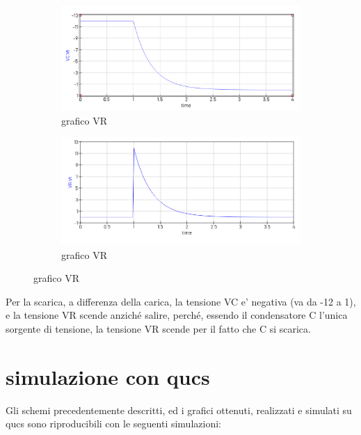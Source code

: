\documentclass[12pt]{article}
\begin{document}
\begin{figure}[h!]
  \centering
  \begin{subfigure}[b]{0.49\linewidth}
    \includegraphics[width=\linewidth]{data/scarica-VC.png}
    \caption*{grafico VR}
  \end{subfigure}
  \begin{subfigure}[b]{0.49\linewidth}
    \includegraphics[width=\linewidth]{data/scarica-VR.png}
    \caption*{grafico VR}
  \end{subfigure}
\end{figure}

Per la scarica, a differenza della carica, la tensione VC e' negativa (va da -12 a 1), e la tensione VR scende anziché salire, perché, essendo il condensatore C l'unica sorgente di tensione, la tensione VR scende per il fatto che C si scarica.

\newpage

\section*{simulazione con qucs}
Gli schemi precedentemente descritti, ed i grafici ottenuti, realizzati e simulati su qucs sono riproducibili con le seguenti simulazioni:  
\end{document}
